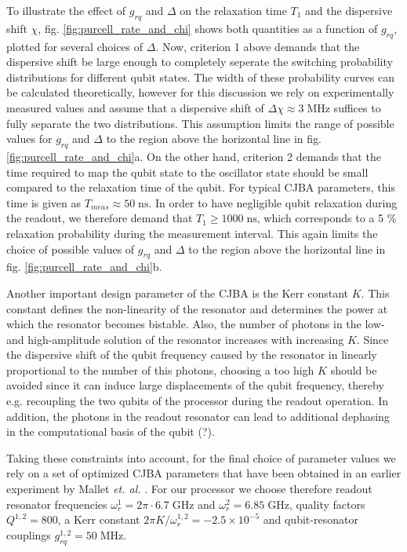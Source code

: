 To illustrate the effect of $g_{rq}$ and $\Delta$ on the relaxation time $T_1$ and the dispersive shift $\chi$, fig. \ref{fig:purcell_rate_and_chi} shows both quantities as a function of $g_{rq}$, plotted for several choices of $\Delta$. Now, criterion 1 above demands that the dispersive shift be large enough to completely seperate the switching probability distributions for different qubit states. The width of these probability curves can be calculated theoretically, however for this discussion we rely on experimentally measured values and assume that a dispersive shift of $\Delta \chi \approx 3\;\mathrm{MHz}$ suffices to fully separate the two distributions. This assumption limits the range of possible values for $g_{rq}$ and $\Delta$ to the region above the horizontal line in fig. \ref{fig:purcell_rate_and_chi}a. On the other hand, criterion 2 demands that the time required to map the qubit state to the oscillator state should be small compared to the relaxation time of the qubit. For typical CJBA parameters, this time is given as $T_{meas}\approx 50\;\mathrm{ns}$. In order to have negligible qubit relaxation during the readout, we therefore demand that $T_1 \ge 1000\;\mathrm{ns}$, which corresponds to a 5 \% relaxation probability during the measurement interval. This again limits the choice of possible values of $g_{rq}$ and $\Delta$ to the region above the horizontal line in fig. \ref{fig:purcell_rate_and_chi}b. 

\smallskip

Another important design parameter of the CJBA is the Kerr constant $K$. This constant defines the non-linearity of the resonator and determines the power at which the resonator becomes bistable. Also, the number of photons in the low- and high-amplitude solution of the resonator increases with increasing $K$. Since the dispersive shift of the qubit frequency caused by the resonator in linearly proportional to the number of this photons, choosing a too high $K$ should be avoided since it can induce large displacements of the qubit frequency, thereby e.g. recoupling the two qubits of the processor during the readout operation. In addition, the photons in the readout resonator can lead to additional dephasing in the computational basis of the qubit (?).

\smallskip

Taking these constraints into account, for the final choice of parameter values we rely on a set of optimized CJBA parameters that have been obtained in an earlier experiment by Mallet {\it et. al.} \citep{mallet_single-shot_2009}. For our processor we choose therefore readout resonator frequencies $\omega_r^1 = 2\pi \cdot 6.7 \;\mathrm{GHz}$ and $\omega_r^2 = 6.85\;\mathrm{GHz}$, quality factors $Q^{1,2}=800$, a Kerr constant $2\pi K/\omega_r^{1,2}=-2.5\times 10^{-5}$ and qubit-resonator couplings $g_{rq}^{1,2}=50\;\mathrm{MHz}$.

